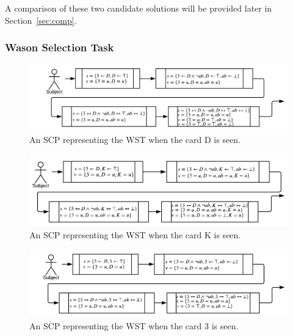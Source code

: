 \documentclass{article}
\begin{document}
A comparison of these two candidate solutions will be provided later in Section~\ref{sec:comp}.




\subsubsection{Wason Selection Task} \label{ssec:WSTCPD}


\begin{figure}
\begin{center}
 \centering \includegraphics[scale=0.75]{WSTSCPD}
\caption{An SCP representing the WST when the card D is seen. }
\label {fig:wstscpD}
\end{center}
\end{figure}

\begin{figure}
\begin{center}
 \centering \includegraphics[scale=0.75]{WSTSCPK}
\caption{An SCP representing the WST when the card K is seen. }
\label {fig:wstscpK}
\end{center}
\end{figure}

\begin{figure}
\begin{center}
 \centering \includegraphics[scale=0.75]{WSTSCP3}
\caption{An SCP representing the WST when the card 3 is seen. }
\label {fig:wstscp3}
\end{center}
\end{figure}
\end{document}
